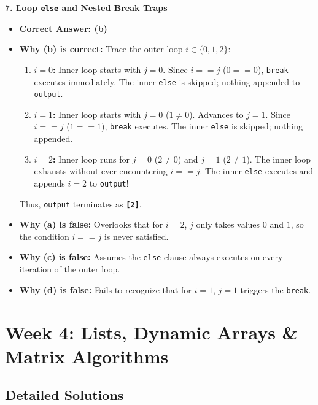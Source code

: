 \textbf{7. Loop \texttt{else} and Nested Break Traps}
\begin{itemize}
    \item \textbf{Correct Answer: (b)}
    \item \textbf{Why (b) is correct:}
    Trace the outer loop $i \in \{0, 1, 2\}$:
    \begin{enumerate}
        \item \textbf{$i = 0$:} Inner loop starts with $j = 0$. Since $i == j$ ($0 == 0$), \texttt{break} executes immediately. The inner \texttt{else} is skipped; nothing appended to \texttt{output}.
        \item \textbf{$i = 1$:} Inner loop starts with $j = 0$ ($1 \neq 0$). Advances to $j = 1$. Since $i == j$ ($1 == 1$), \texttt{break} executes. The inner \texttt{else} is skipped; nothing appended.
        \item \textbf{$i = 2$:} Inner loop runs for $j = 0$ ($2 \neq 0$) and $j = 1$ ($2 \neq 1$). The inner loop exhausts without ever encountering $i == j$. The inner \texttt{else} executes and appends $i = 2$ to \texttt{output}!
    \end{enumerate}
    Thus, \texttt{output} terminates as \textbf{\texttt{[2]}}.
    \item \textbf{Why (a) is false:} Overlooks that for $i = 2$, $j$ only takes values $0$ and $1$, so the condition $i == j$ is never satisfied.
    \item \textbf{Why (c) is false:} Assumes the \texttt{else} clause always executes on every iteration of the outer loop.
    \item \textbf{Why (d) is false:} Fails to recognize that for $i = 1$, $j = 1$ triggers the \texttt{break}.
\end{itemize}

\section*{Week 4: Lists, Dynamic Arrays \& Matrix Algorithms}

\subsection*{Detailed Solutions}

